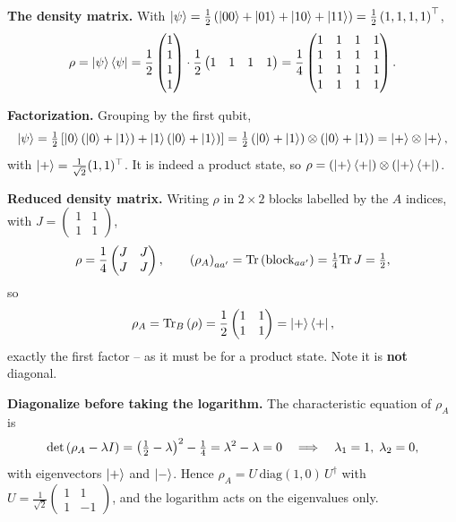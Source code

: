 \documentclass[a4paper, 10pt]{article}
\begin{document}
\begin{solution}
	\noindent \textbf{The density matrix.} With \( \ket{\psi} = \tfrac{1}{2}\left(\ket{00} + \ket{01} + \ket{10} + \ket{11}\right) = \tfrac{1}{2}\left(1, 1, 1, 1\right)^{\top} \),
	\[
		\rho = \ket{\psi}\bra{\psi}
		= \frac{1}{2}\begin{pmatrix} 1 \\ 1 \\ 1 \\ 1 \end{pmatrix}
		\cdot \frac{1}{2}\begin{pmatrix} 1 & 1 & 1 & 1 \end{pmatrix}
		= \frac{1}{4}\begin{pmatrix}
			1 & 1 & 1 & 1 \\
			1 & 1 & 1 & 1 \\
			1 & 1 & 1 & 1 \\
			1 & 1 & 1 & 1
		\end{pmatrix}.
	\]

	\noindent \textbf{Factorization.} Grouping by the first qubit,
	\[
		\ket{\psi}
		= \tfrac{1}{2}\left[ \ket{0}\left(\ket{0} + \ket{1}\right) + \ket{1}\left(\ket{0} + \ket{1}\right) \right]
		= \tfrac{1}{2}\left(\ket{0} + \ket{1}\right) \otimes \left(\ket{0} + \ket{1}\right)
		= \ket{+} \otimes \ket{+},
	\]
	with \( \ket{+} = \tfrac{1}{\sqrt{2}}(1, 1)^{\top} \). It is indeed a product state, so \( \rho = \left(\ket{+}\bra{+}\right) \otimes \left(\ket{+}\bra{+}\right) \).

	\noindent \textbf{Reduced density matrix.} Writing \( \rho \) in \( 2 \times 2 \) blocks labelled by the \( A \) indices, with \( J = \begin{pmatrix} 1 & 1 \\ 1 & 1 \end{pmatrix} \),
	\[
		\rho = \frac{1}{4}\begin{pmatrix} J & J \\ J & J \end{pmatrix},
		\qquad
		\left(\rho_A\right)_{aa'} = \mathrm{Tr}\left(\text{block}_{aa'}\right) = \tfrac{1}{4}\mathrm{Tr}\, J = \tfrac{1}{2},
	\]
	so
	\[
		\rho_A = \mathrm{Tr}_B\left(\rho\right) = \frac{1}{2}\begin{pmatrix} 1 & 1 \\ 1 & 1 \end{pmatrix} = \ket{+}\bra{+},
	\]
	exactly the first factor -- as it must be for a product state. Note it is \textbf{not} diagonal.

	\noindent \textbf{Diagonalize before taking the logarithm.} The characteristic equation of \( \rho_A \) is
	\[
		\det\left(\rho_A - \lambda I\right) = \left(\tfrac{1}{2} - \lambda\right)^2 - \tfrac{1}{4} = \lambda^2 - \lambda = 0
		\quad\Longrightarrow\quad
		\lambda_1 = 1, \; \lambda_2 = 0,
	\]
	with eigenvectors \( \ket{+} \) and \( \ket{-} \). Hence \( \rho_A = U \, \mathrm{diag}(1, 0) \, U^{\dagger} \) with \( U = \tfrac{1}{\sqrt{2}}\begin{pmatrix} 1 & 1 \\ 1 & -1 \end{pmatrix} \), and the logarithm acts on the eigenvalues only.


\end{solution}
\end{document}
